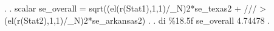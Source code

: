 . 
. scalar se_overall = sqrt((el(r(Stat1),1,1)/_N){\caret}2*se_texas{\caret}2 + /// 
>                                          (el(r(Stat2),1,1)/_N){\caret}2*se_arkansas{\caret}2)
{\smallskip}
.                                          
. di \%18.5f se_overall
           4.74478
{\smallskip}
. 
